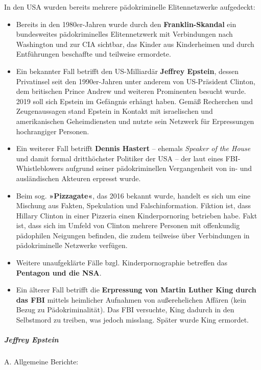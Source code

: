 In den USA wurden bereits mehrere pädokriminelle Elitennetzwerke
aufgedeckt:

\begin{itemize}
\tightlist
\item
  Bereits in den 1980er-Jahren wurde durch den \textbf{Franklin-Skandal}
  ein bundesweites pädokriminelles Elitennetzwerk mit Verbindungen nach
  Washington und zur CIA sichtbar, das Kinder aus Kinderheimen und durch
  Entführungen beschaffte und teilweise ermordete.
\item
  Ein bekannter Fall betrifft den US-Milliardär \textbf{Jeffrey
  Epstein}, dessen Privatinsel seit den 1990er-Jahren unter anderem von
  US-Präsident Clinton, dem britischen Prince Andrew und weiteren
  Promi­nenten besucht wurde. 2019 soll sich Epstein im Gefängnis
  erhängt haben. Gemäß Recherchen und Zeugenaussagen stand Epstein in
  Kontakt mit israelischen und amerikanischen Geheimdiensten und nutzte
  sein Netzwerk für Erpressungen hochrangiger Personen.
\item
  Ein weiterer Fall betrifft \textbf{Dennis Hastert} -- ehemals
  \emph{Speaker of the House} und damit formal dritthöchster Politiker
  der USA -- der laut eines FBI-Whistleblowers aufgrund seiner
  pädokriminellen Vergangenheit von in- und ausländischen Akteuren
  erpresst wurde.
\item
  Beim sog. \textbf{»Pizzagate«}, das 2016 bekannt wurde, handelt es
  sich um eine Mischung aus Fakten, Spekulation und Falschinformation.
  Fiktion ist, dass Hillary Clinton in einer Pizzeria einen
  Kinderpornoring betrieben habe. Fakt ist, dass sich im Umfeld von
  Clinton mehrere Personen mit offenkundig pädophilen Neigungen
  befinden, die zudem teilweise über Verbindungen in pädokriminelle
  Netzwerke verfügen.
\item
  Weitere unaufgeklärte Fälle bzgl. Kinderpornographie betreffen das
  \textbf{Pentagon und die NSA}.
\item
  Ein älterer Fall betrifft die \textbf{Erpressung von Martin Luther
  King durch das FBI} mittels heimlicher Aufnahmen von außerehelichen
  Affären (kein Bezug zu Pädokriminalität). Das FBI versuchte, King
  dadurch in den Selbstmord zu treiben, was jedoch misslang. Später
  wurde King ermordet.
\end{itemize}

\hypertarget{jeffrey-epstein}{%
\subparagraph{\texorpdfstring{\textbf{Jeffrey
Epstein}}{Jeffrey Epstein}}\label{jeffrey-epstein}}

A. Allgemeine Berichte:

